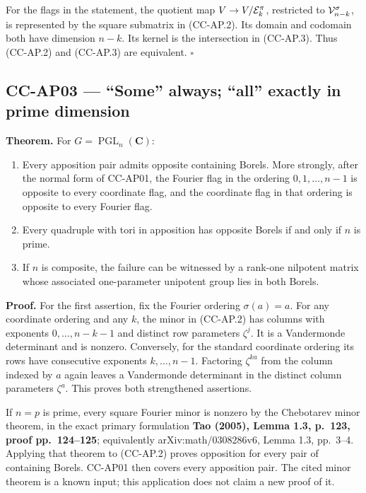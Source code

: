 \documentclass[11pt,a4paper]{article}
\providecommand{\tightlist}{\setlength{\itemsep}{0pt}\setlength{\parskip}{0pt}}
\theoremstyle{definition}\newtheorem{definition}[theorem]{Definition}
\theoremstyle{remark}\newtheorem{remark}[theorem]{Remark}
\begin{document}
For the flags in the statement, the quotient map
\(V\to V/{\cal E}^{\pi}_k\), restricted to \({\cal V}^{\sigma}_{n-k}\),
is represented by the square submatrix in (CC-AP.2). Its domain and
codomain both have dimension \(n-k\). Its kernel is the intersection in
(CC-AP.3). Thus (CC-AP.2) and (CC-AP.3) are equivalent. \(\square\)

\subsection{CC-AP03 --- ``Some'' always; ``all'' exactly in prime
dimension}\label{cc-ap03-some-always-all-exactly-in-prime-dimension}

\textbf{Theorem.} For \(G=\operatorname{PGL}_n(\mathbf C)\):

\begin{enumerate}
\def\labelenumi{\arabic{enumi}.}
\tightlist
\item
  Every apposition pair admits opposite containing Borels. More
  strongly, after the normal form of CC-AP01, the Fourier flag in the
  ordering \(0,1,\ldots,n-1\) is opposite to every coordinate flag, and
  the coordinate flag in that ordering is opposite to every Fourier
  flag.
\item
  Every quadruple with tori in apposition has opposite Borels if and
  only if \(n\) is prime.
\item
  If \(n\) is composite, the failure can be witnessed by a rank-one
  nilpotent matrix whose associated one-parameter unipotent group lies
  in both Borels.
\end{enumerate}

\textbf{Proof.} For the first assertion, fix the Fourier ordering
\(\sigma(a)=a\). For any coordinate ordering and any \(k\), the minor in
(CC-AP.2) has columns with exponents \(0,\ldots,n-k-1\) and distinct row
parameters \(\zeta^j\). It is a Vandermonde determinant and is nonzero.
Conversely, for the standard coordinate ordering its rows have
consecutive exponents \(k,\ldots,n-1\). Factoring \(\zeta^{ka}\) from
the column indexed by \(a\) again leaves a Vandermonde determinant in
the distinct column parameters \(\zeta^a\). This proves both
strengthened assertions.

If \(n=p\) is prime, every square Fourier minor is nonzero by the
Chebotarev minor theorem, in the exact primary formulation \textbf{Tao
(2005), Lemma 1.3, p.~123, proof pp.~124--125}; equivalently
arXiv:math/0308286v6, Lemma 1.3, pp.~3--4. Applying that theorem to
(CC-AP.2) proves opposition for every pair of containing Borels. CC-AP01
then covers every apposition pair. The cited minor theorem is a known
input; this application does not claim a new proof of it.
\end{document}
